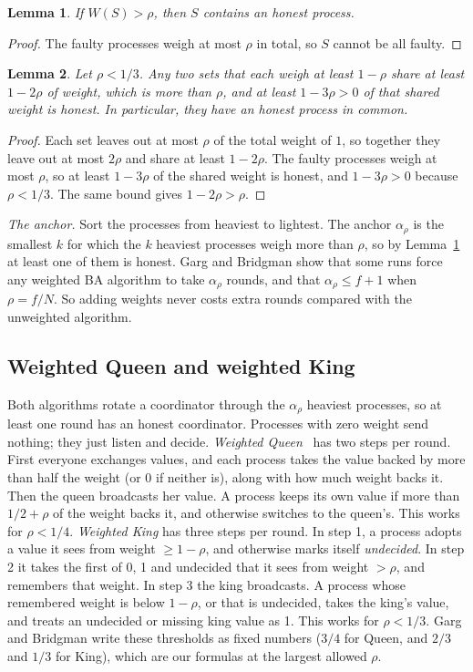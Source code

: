 \documentclass[conference]{IEEEtran}
\newtheorem{lemma}{Lemma}
\theoremstyle{definition}
\newcommand{\W}{W}
\begin{document}
\begin{lemma}\label{lemma:heavy}
If $\W(S)>\rho$, then $S$ contains an honest process.
\end{lemma}
\begin{proof}
The faulty processes weigh at most $\rho$ in total, so $S$ cannot be all faulty.
\end{proof}
\begin{lemma}\label{lemma:quorum}
Let $\rho<1/3$. Any two sets that each weigh at least $1-\rho$ share at least $1-2\rho$ of weight, which is more than $\rho$, and at least $1-3\rho>0$ of that shared weight is honest. In particular, they have an honest process in common.
\end{lemma}
\begin{proof}
Each set leaves out at most $\rho$ of the total weight of $1$, so together they leave out at most $2\rho$ and share at least $1-2\rho$. The faulty processes weigh at most $\rho$, so at least $1-3\rho$ of the shared weight is honest, and $1-3\rho>0$ because $\rho<1/3$. The same bound gives $1-2\rho>\rho$.
\end{proof}

\emph{The anchor.} Sort the processes from heaviest to lightest. The anchor $\alpha_\rho$ is the smallest $k$ for which the $k$ heaviest processes weigh more than $\rho$, so by Lemma~\ref{lemma:heavy} at least one of them is honest. Garg and Bridgman show that some runs force any weighted BA algorithm to take $\alpha_\rho$ rounds, and that $\alpha_\rho\le f+1$ when $\rho=f/N$. So adding weights never costs extra rounds compared with the unweighted algorithm.

\subsection{Weighted Queen and weighted King}
Both algorithms rotate a coordinator through the $\alpha_\rho$ heaviest processes, so at least one round has an honest coordinator. Processes with zero weight send nothing; they just listen and decide. \emph{Weighted Queen}~\cite{garg2011} has two steps per round. First everyone exchanges values, and each process takes the value backed by more than half the weight (or 0 if neither is), along with how much weight backs it. Then the queen broadcasts her value. A process keeps its own value if more than $1/2+\rho$ of the weight backs it, and otherwise switches to the queen's. This works for $\rho<1/4$. \emph{Weighted King} has three steps per round. In step 1, a process adopts a value it sees from weight $\ge 1-\rho$, and otherwise marks itself \emph{undecided}. In step 2 it takes the first of 0, 1 and undecided that it sees from weight $>\rho$, and remembers that weight. In step 3 the king broadcasts. A process whose remembered weight is below $1-\rho$, or that is undecided, takes the king's value, and treats an undecided or missing king value as 1. This works for $\rho<1/3$. Garg and Bridgman write these thresholds as fixed numbers ($3/4$ for Queen, and $2/3$ and $1/3$ for King), which are our formulas at the largest allowed $\rho$. 
\end{document}
